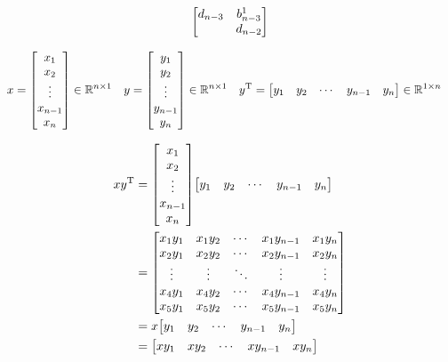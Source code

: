 \documentclass[11pt]{article}
\newcommand{\T}{\mathrm{T}}
\begin{document}
$$
\mqty[d_{n-3} & b^{1}_{n-3} \\ & d_{n-2}]
$$



\begin{align*}
    x &= \mqty[
        x_{1} \\
        x_{2} \\
        \vdots \\
        x_{n-1} \\
        x_{n}
        ]
    \in \mathbb{R}^{n \times 1}
    &
    y &= \mqty[
        y_{1} \\
        y_{2} \\
        \vdots \\
        y_{n-1} \\
        y_{n}
        ]
    \in \mathbb{R}^{n \times 1}
    &
    y^{\T} &= \mqty[
        y_{1} & y_{2} & \cdots & y_{n-1} & y_{n}
        ] \in \mathbb{R}^{1 \times n}
\end{align*}



\begin{align*}
    xy^{\T} &= \mqty[
        x_{1} \\
        x_{2} \\
        \vdots \\
        x_{n-1} \\
        x_{n}
        ]
        \mqty[
        y_{1} & y_{2} & \cdots & y_{n-1} & y_{n}
        ]\\
    &= \mqty[
        x_{1} y_{1} & x_{1} y_{2} & \cdots & x_{1} y_{n-1} & x_{1} y_{n}\\
        x_{2} y_{1} & x_{2} y_{2} & \cdots & x_{2} y_{n-1} & x_{2} y_{n}\\
        \vdots & \vdots & \ddots & \vdots & \vdots\\
        x_{4} y_{1} & x_{4} y_{2} & \cdots & x_{4} y_{n-1} & x_{4} y_{n}\\
        x_{5} y_{1} & x_{5} y_{2} & \cdots & x_{5} y_{n-1} & x_{5} y_{n}
        ]\\
    &= x\mqty[
            y_{1} & y_{2} & \cdots & y_{n-1} & y_{n}
            ]\\
    &= \mqty[
        xy_{1} & xy_{2} & \cdots & xy_{n-1} & xy_{n}
        ]
\end{align*}
\end{document}
